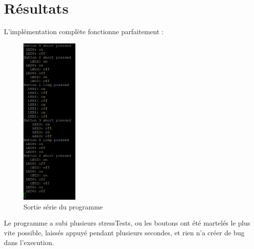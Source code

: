 \section{Résultats}
L'implémentation complète fonctionne parfaitement :
\begin{figure}[H]
    \centering
    \includegraphics[width=0.25\textwidth]{Images/buttons/results.png}
    \caption[Full UML]{Sortie série du programme}
\end{figure}
Le programme a subi plusieurs stressTests, ou les boutons ont été martelés
le plus vite possible, laissés appuyé pendant plusieurs secondes, et rien n'a
créer de bug dans l'execution.